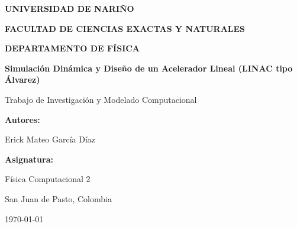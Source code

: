\documentclass[12pt,a4paper]{report}
\begin{document}
\begin{titlepage}
    \centering
    \vspace*{0.5cm}
    {\bfseries\Large UNIVERSIDAD DE NARIÑO \par}
    \vspace{0.3cm}
    {\bfseries\large FACULTAD DE CIENCIAS EXACTAS Y NATURALES \par}
    \vspace{0.2cm}
    {\bfseries\large DEPARTAMENTO DE FÍSICA \par}
    \vspace{1.8cm}
    
    {\huge\bfseries Simulación Dinámica y Diseño de un Acelerador Lineal (LINAC tipo Álvarez) \par}
    \vspace{0.5cm}
    {\large Trabajo de Investigación y Modelado Computacional \par}
    \vspace{2.0cm}
    
    {\large\textbf{Autores:}\par}
    {\large Erick Mateo García Díaz \par}
    \vspace{1.2cm}
    
    {\large\textbf{Asignatura:}\par}
    {Física Computacional 2 \par}
    \vspace{2.0cm}
    
    {\large San Juan de Pasto, Colombia \par}
    {\large \today \par}
\end{titlepage}






\newpage
\tableofcontents
\newpage
\listoffigures
\newpage
\listoftables
\newpage











\nocite{*} %


\end{document}
